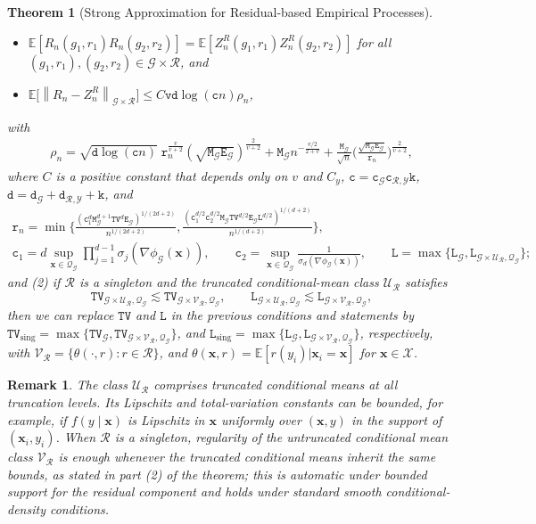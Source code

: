 \documentclass[10pt]{article}
\newtheorem{thm}{Theorem}
\newtheorem{remark}{Remark}
\newcommand{\E}{\mathbb{E}}
\newcommand{\norm}[1]{\left\lVert#1\right\rVert}
\newcommand{\bx}{\mathbf{x}}
\newcommand{\G}{\mathcal{G}}
\newcommand{\Q}{\mathcal{Q}}
\newcommand{\R}{\mathcal{R}}
\newcommand{\V}{\mathcal{V}}
\newcommand{\X}{\mathcal{X}}
\newcommand{\Y}{\mathcal{Y}}
\newcommand{\ttc}{\mathtt{c}}
\newcommand{\ttd}{\mathtt{d}}
\newcommand{\ttE}{\mathtt{E}}
\newcommand{\ttk}{\mathtt{k}}
\newcommand{\ttL}{\mathtt{L}}
\newcommand{\ttM}{\mathtt{M}}
\newcommand{\ttTV}{\mathtt{TV}}
\begin{document}
\begin{thm}[Strong Approximation for Residual-based Empirical Processes]
    \begin{itemize}
        \item $\E[R_n(g_1, r_1) R_n(g_2, r_2)] = \E[Z^R_n(g_1, r_1) Z^R_n(g_2, r_2)]$ for all $(g_1, r_1), (g_2, r_2) \in \G \times \R$, and
        \item $\E\big[\norm{R_n - Z_n^R}_{\G \times \R}\big] \leq C \mathtt{v} \ttd \log(\ttc n) \rho_n$,
    \end{itemize}
    with
    \begin{align*}
        \rho_n = \sqrt{\ttd \log (\ttc n)} \; \mathtt{r}_n^{\frac{v}{v +2}}(\sqrt{\ttM_{\G}\ttE_{\G}})^{\frac{2}{v+2}} + \ttM_{\G} n^{-\frac{v/2}{2+v}} +  \frac{\ttM_{\G}}{\sqrt{n}}  \Big(\frac{\sqrt{\ttM_{\G} \ttE_{\G}}}{\mathtt{r}_n}\Big)^{\frac{2}{v+2}},
    \end{align*}
    where $C$ is a positive constant that depends only on $v$ and $C_y$, $\ttc = \ttc_{\G} \ttc_{\R,\Y} \ttk$, $\ttd = \ttd_{\G} + \ttd_{\R,\Y} + \ttk$, and
    \begin{gather*}
        \mathtt{r}_n = \min\Big\{\frac{(\mathtt{c}_1^d \ttM_{\G}^{d+1} \ttTV^d \mathtt{E}_{\G})^{1/(2d+2)} }{n^{1/(2d+2)}}, \frac{(\mathtt{c}_1^{d/2} \mathtt{c}_2^{d/2} \ttM_{\G} \ttTV^{d/2} \mathtt{E}_{\G} \ttL^{d/2})^{1/(d+2)}}{n^{1/(d+2)}} \Big\}, \\
        \ttc_1 = d \sup_{\bx \in \mathcal{Q}_{\G}} \prod_{j = 1}^{d-1} \sigma_j(\nabla \phi_{\G}(\bx)), \qquad
        \ttc_2 = \sup_{\bx \in \mathcal{Q}_{\G}} \frac{1}{\sigma_{d}(\nabla \phi_{\G}(\bx))}, \qquad
        \ttL = \max\{\ttL_{\G}, \ttL_{\G \times \mathscr{U}_{\R},\Q_{\G}}\};
    \end{gather*}
    and (2) if $\R$ is a singleton and the truncated conditional-mean class $\mathscr{U}_{\R}$ satisfies
    \[
        \ttTV_{\G\times\mathscr{U}_{\R},\Q_{\G}}\lesssim \ttTV_{\G\times\V_{\R},\Q_{\G}},
        \qquad
        \ttL_{\G\times\mathscr{U}_{\R},\Q_{\G}}\lesssim \ttL_{\G\times\V_{\R},\Q_{\G}},
    \]
    then we can replace $\ttTV$ and $\ttL$ in the previous conditions and statements by $\ttTV_{\text{sing}} = \max\{\ttTV_{\G}, \ttTV_{\G \times \V_{\R}, \Q_{\G}}\}$, and $\ttL_{\text{sing}} = \max\{\ttL_{\G}, \ttL_{\G \times \V_{\R},\Q_{\G}}\}$, respectively, with $\V_{\R} = \{\theta(\cdot,r) : r \in \R\}$, and $\theta(\bx,r) = \E[r(y_i) |\bx_i = \bx]$ for $\bx \in \X$.
\end{thm}

\begin{remark}
The class $\mathscr{U}_{\mathcal R}$ comprises truncated conditional means at all truncation levels. Its Lipschitz and total-variation constants can be bounded, for example, if $f(y \mid \bx)$ is Lipschitz in $\bx$ uniformly over $(\bx,y)$ in the support of $(\bx_i,y_i)$. When $\mathcal R$ is a singleton, regularity of the untruncated conditional mean class $\V_{\mathcal R}$ is enough whenever the truncated conditional means inherit the same bounds, as stated in part (2) of the theorem; this is automatic under bounded support for the residual component and holds under standard smooth conditional-density conditions.
\end{remark}
\end{document}
